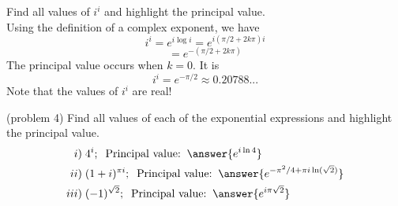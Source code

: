 \documentclass[handout]{ximera}
\begin{document}
\begin{example}[example 4]
Find all values of $i^i$ and highlight the principal value.\\
Using the definition of a complex exponent, we have
\[
i^i = e^{i\log i} = e^{i(\pi/2 + 2k\pi)i} 
\]
\[
= e^{-(\pi/2 + 2k\pi)}
\]
The principal value occurs when $k=0$.  It is
\[
i^i = e^{-\pi/2} \approx 0.20788...
\]
Note that the values of $i^i$ are real!
\end{example}

\begin{problem}(problem 4)
Find all values of each of the exponential expressions and highlight the principal value.\\
\begin{align*}
i) &\; 4^i; \;\; \mbox{Principal value:}\;\; \answer{e^{i\ln 4}}\\
ii) & \;(1+i)^{\pi i}; \;\;\mbox{Principal value:}\;\; \answer{e^{-\pi^2/4 + \pi i \ln(\sqrt2)}}\\
iii) & \;(-1)^{\sqrt 2}; \;\;\mbox{Principal value:}\;\; \answer{e^{i\pi\sqrt 2}}
\end{align*}
\end{problem}
\end{document}
